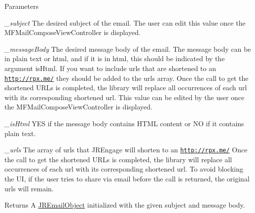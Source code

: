 \begin{DoxyParams}{Parameters}
\item[{\em \_\-subject}]The desired subject of the email. The user can edit this value once the MFMailComposeViewController is displayed.\item[{\em \_\-messageBody}]The desired message body of the email. The message body can be in plain text or html, and if it is in html, this should be indicated by the argument {\ttfamily isHtml}. If you want to include urls that are shortened to an \href{http://rpxnow.com/docs/iphone#shorten_urls}{\tt http://rpx.me/} they should be added to the {\ttfamily urls} array. Once the call to get the shortened URLs is completed, the library will replace all occurrences of each url with its corresponding shortened url. This value can be edited by the user once the MFMailComposeViewController is displayed.\item[{\em \_\-isHtml}]YES if the message body contains HTML content or NO if it contains plain text.\item[{\em \_\-urls}]The array of urls that JREngage will shorten to an \href{http://rpxnow.com/docs/iphone#shorten_urls}{\tt http://rpx.me/} Once the call to get the shortened URLs is completed, the library will replace all occurrences of each url with its corresponding shortened url. To avoid blocking the UI, if the user tries to share via email before the call is returned, the original urls will remain.\end{DoxyParams}
\begin{DoxyReturn}{Returns}
A \hyperlink{interface_j_r_email_object}{JREmailObject} initialized with the given subject and message body. 
\end{DoxyReturn}


